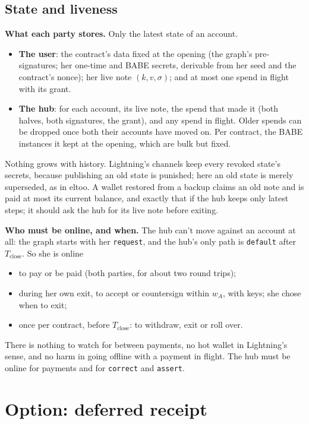 \documentclass[11pt]{article}
\theoremstyle{plain}
\theoremstyle{definition}
\newcommand{\Tc}{T_{\mathrm{close}}}
\newcommand{\tx}[1]{\texttt{#1}}
\begin{document}
\subsection{State and liveness}\label{sec:state}

\textbf{What each party stores.} Only the latest state of an account.
\begin{itemize}[nosep]
\item \textbf{The user}: the contract's data fixed at the opening (the
  graph's pre-signatures; her one-time and BABE secrets, derivable from
  her seed and the contract's nonce); her live note $(k, v, \sigma)$;
  and at most one spend in flight with its grant.
\item \textbf{The hub}: for each account, its live note, the spend that
  made it (both halves, both signatures, the grant), and any spend in
  flight. Older spends can be dropped once both their accounts have
  moved on. Per contract, the BABE instances it kept at the opening,
  which are bulk but fixed.
\end{itemize}
Nothing grows with history. Lightning's channels keep every revoked
state's secrets, because publishing an old state is punished; here an
old state is merely superseded, as in eltoo. A wallet restored from a
backup claims an old note and is paid at most its current balance, and
exactly that if the hub keeps only latest steps; it should ask the hub
for its live note before exiting.

\textbf{Who must be online, and when.} The hub can't move against an
account at all: the graph starts with her \tx{request}, and the hub's
only path is \tx{default} after $\Tc$. So she is online
\begin{itemize}[nosep]
\item to pay or be paid (both parties, for about two round trips);
\item during her own exit, to accept or countersign within $w_A$, with
  keys; she chose when to exit;
\item once per contract, before $\Tc$: to withdraw, exit or roll over.
\end{itemize}
There is nothing to watch for between payments, no hot wallet in
Lightning's sense, and no harm in going offline with a payment in flight.
The hub must be online for payments and for \tx{correct} and
\tx{assert}.

\section{Option: deferred receipt}\label{sec:deferred}
\end{document}
